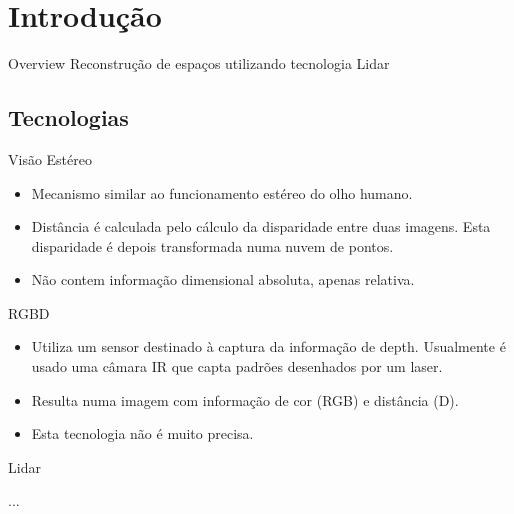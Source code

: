 \section{Introdução}

\begin{frame}{Overview}
	Reconstrução de espaços utilizando tecnologia Lidar			
\end{frame}

\subsection{Tecnologias}

\begin{frame}{Visão Estéreo}
			
	\begin{itemize}
		\item Mecanismo similar ao funcionamento estéreo do olho humano.
		\item Distância é calculada pelo cálculo da disparidade entre duas imagens. Esta disparidade é depois transformada numa nuvem de pontos.
		\item Não contem informação dimensional absoluta, apenas relativa.
	\end{itemize}
	
\end{frame}

\begin{frame}{RGBD}
	
	\begin{itemize}
		\item Utiliza um sensor destinado à captura da informação de depth. Usualmente é usado uma câmara IR que capta padrões desenhados por um laser.
		\item Resulta numa imagem com informação de cor (RGB) e distância (D).
		\item Esta tecnologia não é muito precisa.
	\end{itemize}
	
\end{frame}

\begin{frame}{Lidar}
	
	...
																
\end{frame}

